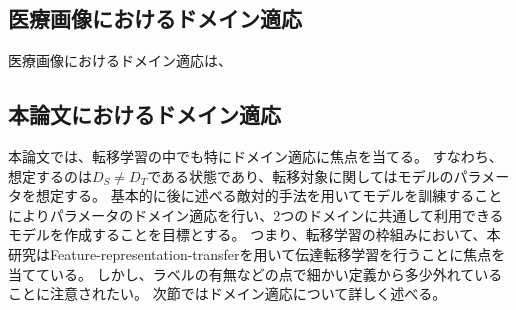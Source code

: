 \subsection{医療画像におけるドメイン適応}
    医療画像におけるドメイン適応は、


\subsection{本論文におけるドメイン適応}
    本論文では、転移学習の中でも特にドメイン適応に焦点を当てる。
    すなわち、想定するのは$D_S \neq D_T$である状態であり、転移対象に関してはモデルのパラメータを想定する。
    基本的に後に述べる敵対的手法\cite{goodfellow2014generative}を用いてモデルを訓練することによりパラメータのドメイン適応を行い、2つのドメインに共通して利用できるモデルを作成することを目標とする。
    つまり、転移学習の枠組みにおいて、本研究はFeature-representation-transferを用いて伝達転移学習を行うことに焦点を当てている。
    しかし、ラベルの有無などの点で細かい定義から多少外れていることに注意されたい。
    次節ではドメイン適応について詳しく述べる。
